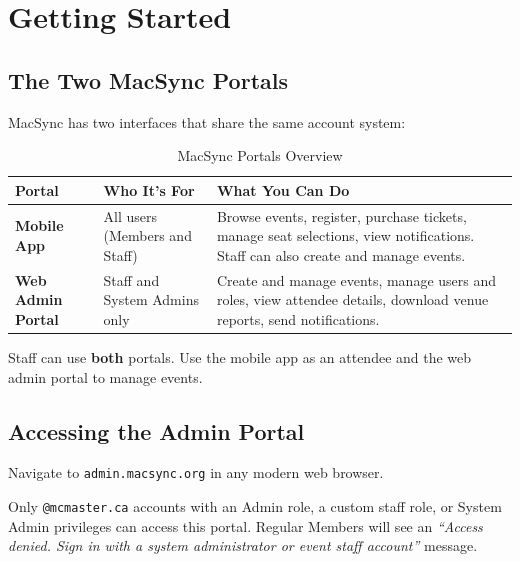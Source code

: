 \documentclass[12pt, twoside]{report}
\begin{document}
\chapter{Getting Started}
\label{chap:started}

\section{The Two MacSync Portals}

MacSync has two interfaces that share the same account system:

\begin{table}[H]
  \centering
  \caption{MacSync Portals Overview}
  \begin{tabular}{@{} p{3.2cm} p{4cm} p{5.5cm} @{}}
    \toprule
    \textbf{Portal} & \textbf{Who It's For} & \textbf{What You Can Do} \\
    \midrule
    \textbf{Mobile App}
      & All users (Members and Staff)
      & Browse events, register, purchase tickets, manage seat selections,
        view notifications. Staff can also create and manage events. \\
    \addlinespace
    \textbf{Web Admin Portal}
      & Staff and System Admins only
      & Create and manage events, manage users and roles,
        view attendee details, download venue reports, send notifications. \\
    \bottomrule
  \end{tabular}
\end{table}

\begin{notebox}
Staff can use \textbf{both} portals. Use the mobile app as an attendee
and the web admin portal to manage events.
\end{notebox}

\section{Accessing the Admin Portal}

Navigate to \texttt{admin.macsync.org} in any modern web browser.

\begin{notebox}
Only \texttt{@mcmaster.ca} accounts with an Admin role, a custom staff role,
or System Admin privileges can access this portal. Regular Members will see
an \textit{``Access denied. Sign in with a system administrator or event
staff account''} message.
\end{notebox}
\end{document}
